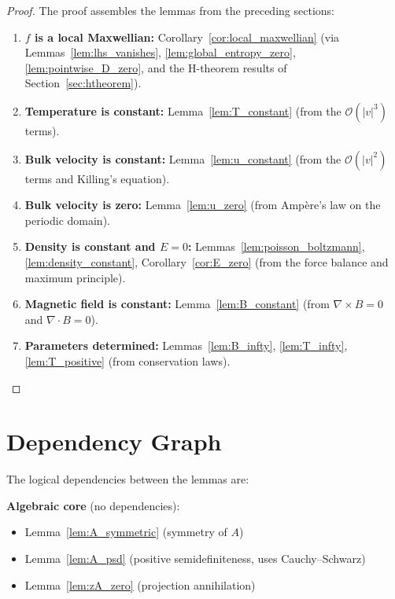 \documentclass[11pt]{article}
\begin{document}
\begin{proof}
The proof assembles the lemmas from the preceding sections:
\begin{enumerate}
\item \textbf{$f$ is a local Maxwellian:} Corollary~\ref{cor:local_maxwellian} (via Lemmas~\ref{lem:lhs_vanishes}, \ref{lem:global_entropy_zero}, \ref{lem:pointwise_D_zero}, and the H-theorem results of Section~\ref{sec:htheorem}).

\item \textbf{Temperature is constant:} Lemma~\ref{lem:T_constant} (from the $\mathcal{O}(|v|^3)$ terms).

\item \textbf{Bulk velocity is constant:} Lemma~\ref{lem:u_constant} (from the $\mathcal{O}(|v|^2)$ terms and Killing's equation).

\item \textbf{Bulk velocity is zero:} Lemma~\ref{lem:u_zero} (from Amp\`ere's law on the periodic domain).

\item \textbf{Density is constant and $E = 0$:} Lemmas~\ref{lem:poisson_boltzmann}, \ref{lem:density_constant}, Corollary~\ref{cor:E_zero} (from the force balance and maximum principle).

\item \textbf{Magnetic field is constant:} Lemma~\ref{lem:B_constant} (from $\nabla \times B = 0$ and $\nabla \cdot B = 0$).

\item \textbf{Parameters determined:} Lemmas~\ref{lem:B_infty}, \ref{lem:T_infty}, \ref{lem:T_positive} (from conservation laws).
\end{enumerate}
\end{proof}

\section{Dependency Graph}
\label{sec:dependencies}

The logical dependencies between the lemmas are:

\bigskip
\noindent
\textbf{Algebraic core} (no dependencies):
\begin{itemize}
\item Lemma~\ref{lem:A_symmetric} (symmetry of $A$)
\item Lemma~\ref{lem:A_psd} (positive semidefiniteness, uses Cauchy--Schwarz)
\item Lemma~\ref{lem:zA_zero} (projection annihilation)
\end{itemize}
\end{document}
